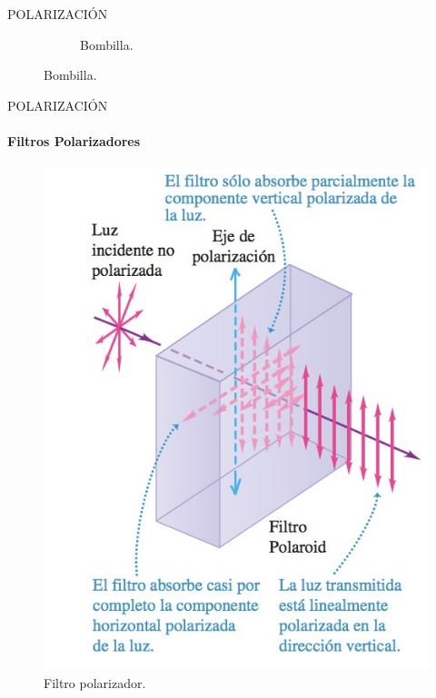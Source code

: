 \begin{frame}{POLARIZACIÓN}
\begin{figure}
\begin{subfigure}[H]{0.32\textwidth}
                \caption{Bombilla\footnotemark{}.}
            \end{subfigure}
        \end{figure}
        \addtocounter{footnote}{-1}
        \addtocounter{footnote}{1}
\end{frame}

\begin{frame}{POLARIZACIÓN}
    \framesubtitle{Filtros Polarizadores}
    \begin{figure}[H]
        \centering
        \includegraphics[scale=0.26]{mari/m_filtropolari.jpeg}
        \caption{Filtro polarizador\footnotemark{}.}
    \end{figure}
    \vspace{-10mm}
\end{frame}

